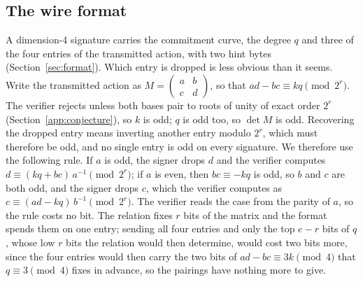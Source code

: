 \documentclass[version=preprint]{iacrcc}
\begin{document}
    \subsection{The wire format}
    \label{sec:wire}
    A dimension-4 signature carries the commitment curve, the degree $q$ and
    three of the four entries of the transmitted action, with two hint bytes
    (Section~\ref{sec:format}). Which entry is dropped is less obvious than it seems. Write the
    transmitted action as $M = \left(\begin{smallmatrix} a & b \\ c & d
    \end{smallmatrix}\right)$, so that $ad - bc \equiv kq \pmod{2^r}$. The
    verifier rejects unless both bases pair to roots of unity of exact order
    $2^r$ (Section~\ref{app:conjecture}), so $k$ is odd; $q$ is odd too, so $\det M$ is odd. Recovering the dropped entry means inverting
    another entry modulo $2^r$, which must therefore be odd, and no single
    entry is odd on every signature. We therefore use the following rule. If
    $a$ is odd, the signer drops $d$ and the verifier computes $d \equiv (kq +
    bc) \, a^{-1} \pmod{2^r}$; if $a$ is even, then $bc \equiv -kq$ is odd, so
    $b$ and $c$ are both odd, and the signer drops $c$, which the verifier
    computes as $c \equiv (ad - kq) \, b^{-1} \pmod{2^r}$. The verifier reads
    the case from the parity of $a$, so the rule costs no bit. The relation
    fixes $r$ bits of the matrix and the format spends them on one entry;
    sending all four entries and only the top $e - r$ bits of $q$, whose low
    $r$ bits the relation would then determine, would cost two bits more,
    since the four entries would then carry the two bits of $ad - bc \equiv 3k
    \pmod 4$ that $q \equiv 3 \pmod 4$ fixes in advance, so the pairings have
    nothing more to give.
\end{document}
